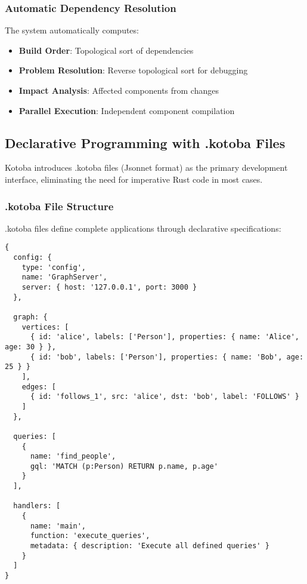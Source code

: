 \documentclass[11pt,a4paper]{article}
\begin{document}
\subsubsection{Automatic Dependency Resolution}
\label{subsubsec:dependency_resolution}

The system automatically computes:
\begin{itemize}
\item \textbf{Build Order}: Topological sort of dependencies
\item \textbf{Problem Resolution}: Reverse topological sort for debugging
\item \textbf{Impact Analysis}: Affected components from changes
\item \textbf{Parallel Execution}: Independent component compilation
\end{itemize}

\subsection{Declarative Programming with .kotoba Files}
\label{subsec:kotoba_files}

Kotoba introduces .kotoba files (Jsonnet format) as the primary development interface, eliminating the need for imperative Rust code in most cases.

\subsubsection{.kotoba File Structure}
\label{subsubsec:kotoba_structure}

.kotoba files define complete applications through declarative specifications:

\begin{lstlisting}[language=jsonnet,caption=Example .kotoba file for HTTP server]
{
  config: {
    type: 'config',
    name: 'GraphServer',
    server: { host: '127.0.0.1', port: 3000 }
  },

  graph: {
    vertices: [
      { id: 'alice', labels: ['Person'], properties: { name: 'Alice', age: 30 } },
      { id: 'bob', labels: ['Person'], properties: { name: 'Bob', age: 25 } }
    ],
    edges: [
      { id: 'follows_1', src: 'alice', dst: 'bob', label: 'FOLLOWS' }
    ]
  },

  queries: [
    {
      name: 'find_people',
      gql: 'MATCH (p:Person) RETURN p.name, p.age'
    }
  ],

  handlers: [
    {
      name: 'main',
      function: 'execute_queries',
      metadata: { description: 'Execute all defined queries' }
    }
  ]
}
\end{lstlisting}
\end{document}
